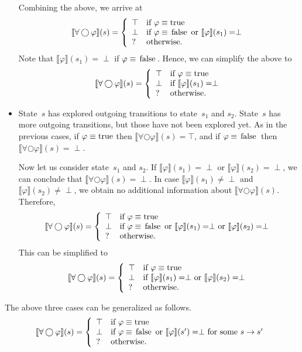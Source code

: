 \documentclass[12pt]{article}
\newcommand{\nxt}{\bigcirc}
\newcommand{\TRUE}{\mbox{\lstinline{true}}}
\newcommand{\FALSE}{\mbox{\lstinline{false}}}
\theoremstyle{definition}
\newcommand{\satisfaction}[1]{\llbracket #1 \rrbracket}
\begin{document}
\begin{itemize}
Combining the above, we arrive at
\[
\satisfaction{\forall \nxt \varphi}(s) = \left \{
\begin{array}{ll}
\top & \mbox{if $\varphi \equiv \TRUE$}\\
\perp & \mbox{if $\varphi \equiv \FALSE$ or $\satisfaction{\varphi}(s_1) = \perp$}\\
? & \mbox{otherwise.}
\end{array}
\right .
\]
Note that $\satisfaction{\varphi}(s_1) = \perp$ if $\varphi \equiv \FALSE$.  Hence, we can simplify the above to
\[
\satisfaction{\forall \nxt \varphi}(s) = \left \{
\begin{array}{ll}
\top & \mbox{if $\varphi \equiv \TRUE$}\\
\perp & \mbox{if $\satisfaction{\varphi}(s_1) = \perp$}\\
? & \mbox{otherwise.}
\end{array}
\right .
\]
\item
State~$s$ has explored outgoing transitions to state~$s_1$ and $s_2$.  State~$s$ has more outgoing transitions, but those have not been explored yet.   As in the previous cases, if  $\varphi \equiv \TRUE$ then $\satisfaction{\forall \nxt \varphi}(s) = \top$, and if $\varphi \equiv \FALSE$ then $\satisfaction{\forall \nxt \varphi}(s) = \perp$. 

Now let us consider state~$s_1$ and $s_2$.  If $\satisfaction{\varphi}(s_1) = \perp$ or $\satisfaction{\varphi}(s_2) = \perp$, we can conclude that $\satisfaction{\forall \nxt \varphi}(s) = \perp$.  In case $\satisfaction{\varphi}(s_1)\not= \perp$ and $\satisfaction{\varphi}(s_2)\not= \perp$, we obtain no additional information about $\satisfaction{\forall \nxt \varphi}(s)$.  Therefore,
\[
\satisfaction{\forall \nxt \varphi}(s) = \left \{
\begin{array}{ll}
\top & \mbox{if $\varphi \equiv \TRUE$}\\
\perp & \mbox{if $\varphi \equiv \FALSE$ or $\satisfaction{\varphi}(s_1) = \perp$ or $\satisfaction{\varphi}(s_2) = \perp$}\\
? & \mbox{otherwise.}
\end{array}
\right .
\]
This can be simplified to
\[
\satisfaction{\forall \nxt \varphi}(s) = \left \{
\begin{array}{ll}
\top & \mbox{if $\varphi \equiv \TRUE$}\\
\perp & \mbox{if $\satisfaction{\varphi}(s_1) = \perp$ or $\satisfaction{\varphi}(s_2) = \perp$}\\
? & \mbox{otherwise.}
\end{array}
\right .
\]
\end{itemize}
The above three cases can be generalized as follows.
\[
\satisfaction{\forall \nxt \varphi}(s) = \left \{
\begin{array}{ll}
\top & \mbox{if $\varphi \equiv \TRUE$}\\
\perp & \mbox{if $\varphi \equiv \FALSE$ or $\satisfaction{\varphi}(s') = \perp$ for some $s \rightarrow s'$}\\
? & \mbox{otherwise.}
\end{array}
\right .
\]
\end{document}
